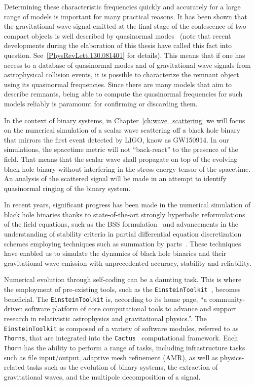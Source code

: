 Determining these characteristic frequencies quickly and accurately for a large range of models is important for many practical reasons. It has been shown that the gravitational wave signal emitted at the final stage of the coalescence of two compact objects is well described by quasinormal modes~\cite{buonanno,seidel} (note that recent developments during the elaboration of this thesis have called this fact into question. See~\ref{PhysRevLett.130.081401} for details). This means that if one has access to a database of quasinormal modes and of gravitational wave signals from astrophysical collision events, it is possible to characterize the remnant object using its quasinormal frequencies. Since there are many models that aim to describe remnants, being able to compute the quasinormal frequencies for such models reliably is paramount for confirming or discarding them.

In the context of binary systems, in Chapter~\ref{ch:wave_scattering} we will focus on the numerical simulation of a scalar wave scattering off a black hole binary that mirrors the first event detected by LIGO, know as GW150914. In our simulations, the spacetime metric will not ``back-react'' to the presence of the field. That means that the scalar wave shall propagate on top of the evolving black hole binary without interfering in the stress-energy tensor of the spacetime. An analysis of the scattered signal will be made in an attempt to identify quasinormal ringing of the binary system.

In recent years, significant progress has been made in the numerical simulation of black hole binaries thanks to state-of-the-art strongly hyperbolic reformulations of the field equations, such as the \ac{BSS} formulation~\cite{PhysRevD.52.5428,PhysRevD.59.024007} and advancements in the understanding of stability criteria in partial differential equation discretization schemes employing techniques such as summation by parts~\cite{Diener2007}. These techniques have enabled us to simulate the dynamics of black hole binaries and their gravitational wave emission with unprecedented accuracy, stability and reliability.

Numerical evolution through self-coding can be a daunting task. This is where the employment of pre-existing tools, such as the \texttt{EinsteinToolkit}~\cite{EinsteinToolkit:2022_11}, becomes beneficial. The \texttt{EinsteinToolkit} is, according to its home page, ``a community-driven software platform of core computational tools to advance and support research in relativistic astrophysics and gravitational physics.''. The \texttt{EinsteinToolkit} is composed of a variety of software modules, referred to as \texttt{Thorns}, that are integrated into the \texttt{Cactus}~\cite{Goodale:2002a} computational framework. Each \texttt{Thorn} has the ability to perform a range of tasks, including infrastructure tasks such as file input/output, adaptive mesh refinement (\ac{AMR}), as well as physics-related tasks such as the evolution of binary systems, the extraction of gravitational waves, and the multipole decomposition of a signal.

